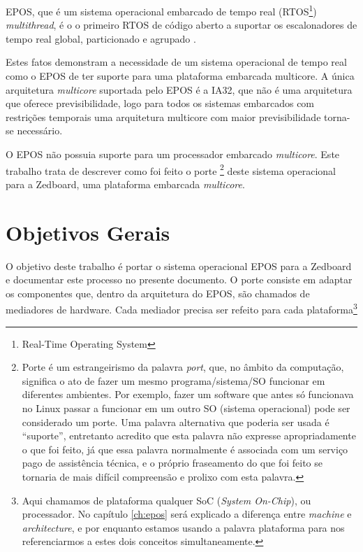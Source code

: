 EPOS, que é um sistema operacional embarcado de tempo real (RTOS\footnote{Real-Time Operating System}) \emph{multithread}, é o o primeiro RTOS de código aberto a suportar os escalonadores de tempo real global, particionado e agrupado \cite{gio}.


Estes fatos demonstram a necessidade de um sistema operacional de tempo real como o EPOS de ter suporte para uma plataforma embarcada multicore. A única arquitetura \emph{multicore} suportada pelo EPOS é a IA32, que não é uma arquitetura que oferece previsibilidade, logo para todos os sistemas embarcados com restrições temporais uma arquitetura multicore com maior previsibilidade torna-se necessário.

O EPOS não possuia suporte para um processador embarcado \emph{multicore}. 
Este trabalho trata de descrever como foi feito o porte
\footnote{Porte é um estrangeirismo da palavra \emph{port}, que, no âmbito da computação, significa o ato de fazer um mesmo programa/sistema/SO funcionar em diferentes ambientes. Por exemplo, fazer um software que antes só funcionava no Linux passar a funcionar em um outro SO (sistema operacional) pode ser considerado um porte. Uma palavra alternativa que poderia ser usada é ``suporte'', entretanto acredito que esta palavra não expresse apropriadamente o que foi feito, já que essa palavra normalmente é associada com um serviço pago de assistência técnica, e o próprio fraseamento do que foi feito se tornaria de mais difícil compreensão e prolixo com esta palavra.}
 deste sistema operacional para a Zedboard, uma plataforma embarcada \emph{multicore}.

\section{Objetivos Gerais}

O objetivo deste trabalho é portar o sistema operacional EPOS para a Zedboard e documentar este processo no presente documento. O porte consiste em adaptar os componentes que, dentro da arquitetura do EPOS, são chamados de mediadores de hardware. Cada mediador precisa ser refeito para cada plataforma\footnote{Aqui chamamos de plataforma qualquer SoC (\emph{System On-Chip}), ou processador. No capítulo \ref{ch:epos} será explicado a diferença entre \emph{machine} e \emph{architecture}, e por enquanto estamos usando a palavra plataforma para nos referenciarmos a estes dois conceitos simultaneamente.}

